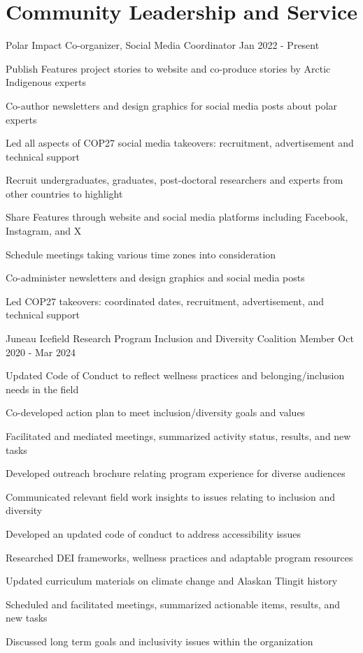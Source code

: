 \documentclass{../styles/cv}
\begin{document}
\section{Community Leadership and Service}

\subsectionpositiondate
    {Polar Impact}
    {Co-organizer, Social Media Coordinator}
    {Jan 2022 - Present}
\resumesublistbegin
    \item Publish Features project stories to website and co-produce stories by Arctic Indigenous experts
    \item Co-author newsletters and design graphics for social media posts about polar experts
    \item Led all aspects of COP27 social media takeovers: recruitment, advertisement and technical support
    \item Recruit undergraduates, graduates, post-doctoral researchers and experts from other countries to highlight
    \item Share  Features through website and social media platforms including Facebook, Instagram, and X
    \item Schedule meetings taking various time zones into consideration
    \item Co-administer newsletters and design graphics and social media posts
    \item Led COP27 takeovers: coordinated dates, recruitment, advertisement, and technical support
\resumesublistend

\subsectionpositiondate
    {Juneau Icefield Research Program}
    {Inclusion and Diversity Coalition Member}
    {Oct 2020 - Mar 2024}
\resumesublistbegin
    \item Updated Code of Conduct to reflect wellness practices and belonging/inclusion needs in the field
    \item Co-developed action plan to meet inclusion/diversity goals and values
    \item Facilitated and mediated meetings, summarized activity status, results, and new tasks
    \item Developed outreach brochure relating program experience for diverse audiences
    \item Communicated relevant field work insights to issues relating to inclusion and diversity
    \item Developed an updated code of conduct to address accessibility issues
    \item Researched DEI frameworks, wellness practices and adaptable program resources
    \item Updated curriculum materials on climate change and Alaskan Tlingit history
    \item Scheduled and facilitated meetings, summarized actionable items, results, and new tasks
    \item Discussed long term goals and inclusivity issues within the organization
\resumesublistend
\end{document}
